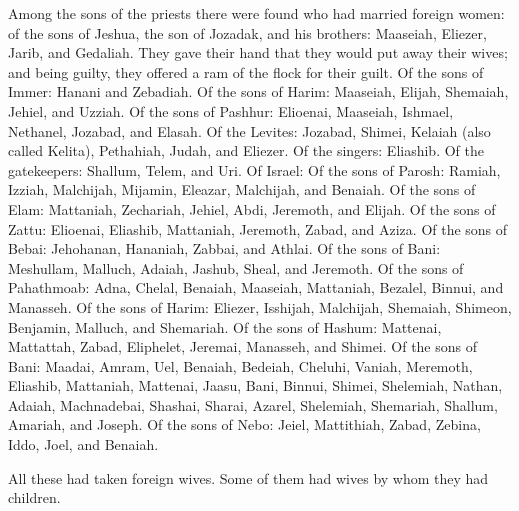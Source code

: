  Among the sons of the priests there were found who had
married foreign women: of the sons of Jeshua, the son of Jozadak, and
his brothers: Maaseiah, Eliezer, Jarib, and Gedaliah. 
They gave their hand that they would put away their wives; and being
guilty, they offered a ram of the flock for their guilt. 
Of the sons of Immer: Hanani and Zebadiah.  Of the sons
of Harim: Maaseiah, Elijah, Shemaiah, Jehiel, and Uzziah.
 Of the sons of Pashhur: Elioenai, Maaseiah, Ishmael,
Nethanel, Jozabad, and Elasah.  Of the Levites: Jozabad,
Shimei, Kelaiah (also called Kelita), Pethahiah, Judah, and Eliezer.
 Of the singers: Eliashib. Of the gatekeepers: Shallum,
Telem, and Uri.  Of Israel: Of the sons of Parosh:
Ramiah, Izziah, Malchijah, Mijamin, Eleazar, Malchijah, and Benaiah.
 Of the sons of Elam: Mattaniah, Zechariah, Jehiel, Abdi,
Jeremoth, and Elijah.  Of the sons of Zattu: Elioenai,
Eliashib, Mattaniah, Jeremoth, Zabad, and Aziza.  Of the
sons of Bebai: Jehohanan, Hananiah, Zabbai, and Athlai. 
Of the sons of Bani: Meshullam, Malluch, Adaiah, Jashub, Sheal, and
Jeremoth.  Of the sons of Pahathmoab: Adna, Chelal,
Benaiah, Maaseiah, Mattaniah, Bezalel, Binnui, and Manasseh.
 Of the sons of Harim: Eliezer, Isshijah, Malchijah,
Shemaiah, Shimeon,  Benjamin, Malluch, and Shemariah.
 Of the sons of Hashum: Mattenai, Mattattah, Zabad,
Eliphelet, Jeremai, Manasseh, and Shimei.  Of the sons of
Bani: Maadai, Amram, Uel,  Benaiah, Bedeiah, Cheluhi,
 Vaniah, Meremoth, Eliashib,  Mattaniah,
Mattenai, Jaasu,  Bani, Binnui, Shimei, 
Shelemiah, Nathan, Adaiah,  Machnadebai, Shashai, Sharai,
 Azarel, Shelemiah, Shemariah,  Shallum,
Amariah, and Joseph.  Of the sons of Nebo: Jeiel,
Mattithiah, Zabad, Zebina, Iddo, Joel, and Benaiah.

 All these had taken foreign wives. Some of them had
wives by whom they had children.
